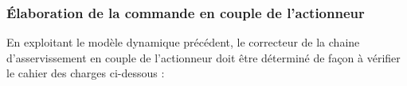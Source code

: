 %
%
%
%
%
%
%
%
%
%
%
%
%


\subsubsection{Élaboration de la commande en couple de l'actionneur}
\ifprof
\else
En exploitant le modèle dynamique précédent, le correcteur de la chaine d'asservissement en couple de l'actionneur doit être déterminé de façon à vérifier le cahier des charges ci-dessous :

